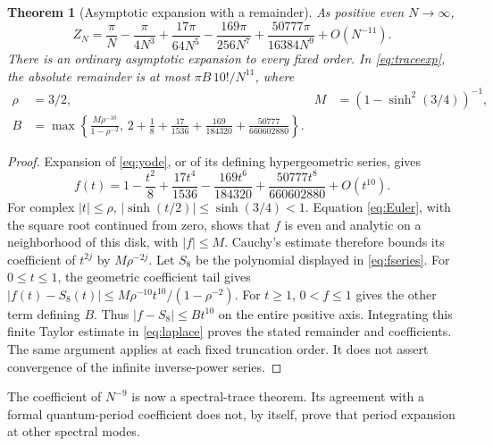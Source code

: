 \documentclass[10pt]{article}
\newtheorem{theorem}{Theorem}
\begin{document}
\begin{theorem}[Asymptotic expansion with a remainder]
As positive even $N\to\infty$,
\begin{equation}
\boxed{Z_N=\frac\pi N-\frac\pi{4N^3}
+\frac{17\pi}{64N^5}-\frac{169\pi}{256N^7}
+\frac{50777\pi}{16384N^9}+O(N^{-11}).}
\label{eq:traceexp}
\end{equation}
There is an ordinary asymptotic expansion to every fixed order.
In \eqref{eq:traceexp}, the absolute remainder is at most
$\pi B\,10!/N^{11}$, where
\begin{align*}
\rho&=3/2,& M&=(1-\sinh^2(3/4))^{-1},\\
B&=\max\left\{\frac{M\rho^{-10}}{1-\rho^{-2}},\,
2+\frac18+\frac{17}{1536}+\frac{169}{184320}
+\frac{50777}{660602880}\right\}.
\end{align*}
\end{theorem}
\begin{proof}
Expansion of \eqref{eq:yode}, or of its defining hypergeometric series,
gives
\begin{equation}
f(t)=1-\frac{t^2}{8}+\frac{17t^4}{1536}
-\frac{169t^6}{184320}+\frac{50777t^8}{660602880}+O(t^{10}).
\label{eq:fseries}
\end{equation}
For complex $|t|\le\rho$, $|\sinh(t/2)|\le\sinh(3/4)<1$.
Equation \eqref{eq:Euler}, with the square root continued from zero,
shows that $f$ is even and analytic on a neighborhood of this disk,
with $|f|\le M$. Cauchy's estimate therefore bounds its coefficient
of $t^{2j}$ by $M\rho^{-2j}$.
Let $S_8$ be the polynomial displayed in \eqref{eq:fseries}.
For $0\le t\le1$, the geometric coefficient tail gives
$|f(t)-S_8(t)|\le M\rho^{-10}t^{10}/(1-\rho^{-2})$.
For $t\ge1$, $0<f\le1$ gives the other term defining $B$.
Thus $|f-S_8|\le Bt^{10}$ on the entire positive axis.
Integrating this finite Taylor estimate in \eqref{eq:laplace} proves
the stated remainder and coefficients. The same argument applies at
each fixed truncation order. It does not assert convergence of the
infinite inverse-power series.
\end{proof}

The coefficient of $N^{-9}$ is now a spectral-trace theorem.
Its agreement with a formal quantum-period coefficient does not,
by itself, prove that period expansion at other spectral modes.
\end{document}
